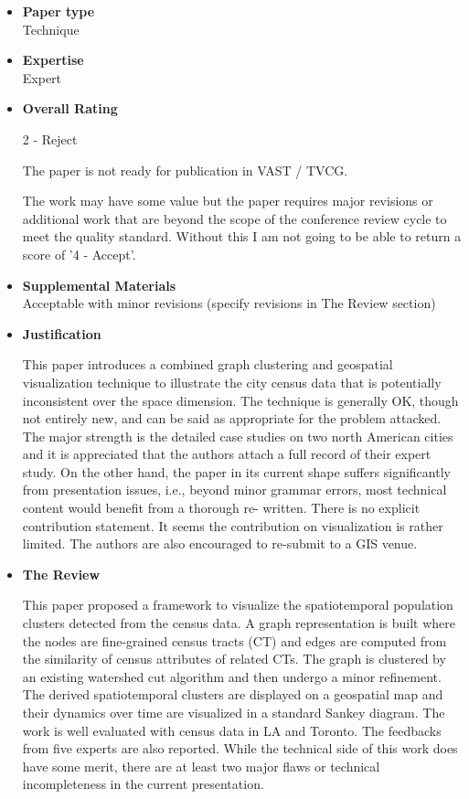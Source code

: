 \documentclass{article}
\begin{document}
\begin{itemize}

\item{\textbf{Paper type}\\Technique}

\item{\textbf{Expertise}\\Expert}

\item{\textbf{Overall Rating}

    2 - Reject
    
    The paper is not ready for publication in VAST / TVCG.
    
    The work may have some value but the paper requires major revisions or
    additional work that are beyond the scope of the conference review cycle to meet
    the quality standard. Without this I am not going to be able to return a score of
    '4 - Accept'.}

\item{\textbf{Supplemental Materials}\\Acceptable with minor revisions (specify revisions in The Review section)}

\item{\textbf{Justification}

    This paper introduces a combined graph clustering and geospatial visualization
    technique to illustrate the city census data that is potentially inconsistent over
    the space dimension. The technique is generally OK, though not entirely new, and
    can be said as appropriate for the problem attacked. The major strength is the
    detailed case studies on two north American cities and it is appreciated that the
    authors attach a full record of their expert study. On the other hand, the paper
    in its current shape suffers significantly from presentation issues, i.e., beyond
    minor grammar errors, most technical content would benefit from a thorough re-
    written. There is no explicit contribution statement. It seems the contribution on
    visualization is rather limited. The authors are also encouraged to re-submit to a
    GIS venue.}

\item{\textbf{The Review}

    This paper proposed a framework to visualize the spatiotemporal population
    clusters detected from the census data. A graph representation is built where the
    nodes are fine-grained census tracts (CT) and edges are computed from the
    similarity of census attributes of related CTs. The graph is clustered by an
    existing watershed cut algorithm and then undergo a minor refinement. The derived
    spatiotemporal clusters are displayed on a geospatial map and their dynamics over
    time are visualized in a standard Sankey diagram. The work is well evaluated with
    census data in LA and Toronto. The feedbacks from five experts are also reported.
    While the technical side of this work does have some merit, there are at least two
    major flaws or technical incompleteness in the current presentation.

}
\end{itemize}
\end{document}
